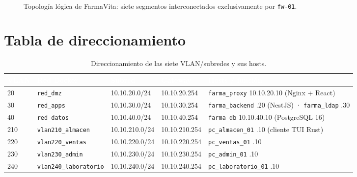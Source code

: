 \documentclass[11pt,a4paper,oneside]{report}
\newcommand{\cod}[1]{\texttt{\small #1}}
\begin{document}
\begin{figure}[htbp]
\caption{Topología lógica de FarmaVita: siete segmentos interconectados exclusivamente por \cod{fw-01}.}
\label{fig:topologia}
\end{figure}

\section{Tabla de direccionamiento}

\begin{table}[htbp]
\centering\small
\caption{Direccionamiento de las siete VLAN/subredes y sus hosts.}
\label{tab:direccionamiento}
\begin{tabularx}{\textwidth}{@{}l l l l X@{}}
\toprule
\rowcolor{fvVerdeOsc}
\textcolor{white}{\textbf{VLAN}} & \textcolor{white}{\textbf{Red Docker}} & \textcolor{white}{\textbf{Subred}} &
\textcolor{white}{\textbf{Gateway}} & \textcolor{white}{\textbf{Hosts / función}} \\
\midrule
20  & \cod{red\_dmz}             & 10.10.20.0/24  & 10.10.20.254  & \cod{farma\_proxy} 10.10.20.10 (Nginx + React) \\
30  & \cod{red\_apps}            & 10.10.30.0/24  & 10.10.30.254  & \cod{farma\_backend} .20 (NestJS) · \cod{farma\_ldap} .30 \\
40  & \cod{red\_datos}           & 10.10.40.0/24  & 10.10.40.254  & \cod{farma\_db} 10.10.40.10 (PostgreSQL 16) \\
210 & \cod{vlan210\_almacen}     & 10.10.210.0/24 & 10.10.210.254 & \cod{pc\_almacen\_01} .10 (cliente TUI Rust) \\
220 & \cod{vlan220\_ventas}      & 10.10.220.0/24 & 10.10.220.254 & \cod{pc\_ventas\_01} .10 \\
230 & \cod{vlan230\_admin}       & 10.10.230.0/24 & 10.10.230.254 & \cod{pc\_admin\_01} .10 \\
240 & \cod{vlan240\_laboratorio} & 10.10.240.0/24 & 10.10.240.254 & \cod{pc\_laboratorio\_01} .10 \\
\bottomrule
\end{tabularx}
\end{table}
\end{document}
